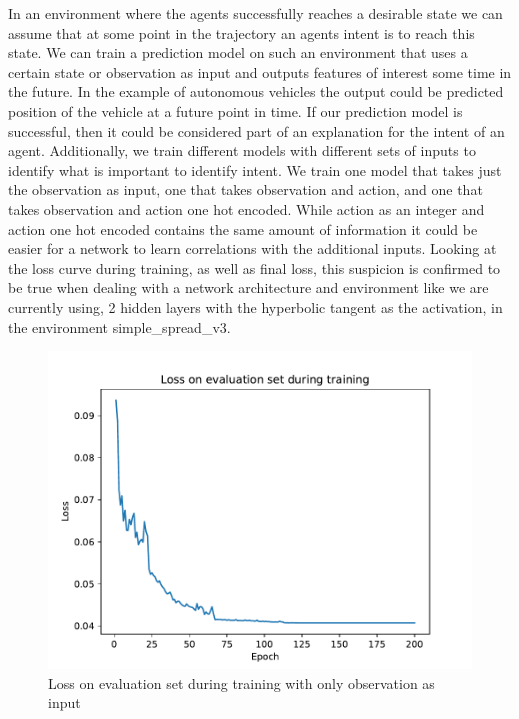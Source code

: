 \documentclass[UKenglish]{uiomasterthesis}
\begin{document}
In an environment where the agents successfully reaches a desirable state we can assume that at some point in the trajectory an agents intent is to reach this state. We can train a prediction model on such an environment that uses a certain state or observation as input and outputs features of interest some time in the future. In the example of autonomous vehicles the output could be predicted position of the vehicle at a future point in time. If our prediction model is successful, then it could be considered part of an explanation for the intent of an agent.
Additionally, we train different models with different sets of inputs to identify what is important to identify intent. We train one model that takes just the observation as input, one that takes observation and action, and one that takes observation and action one hot encoded. While action as an integer and action one hot encoded contains the same amount of information it could be easier for a network to learn correlations with the additional inputs. Looking at the loss curve during training, as well as final loss, this suspicion is confirmed to be true when dealing with a network architecture and environment like we are currently using, 2 hidden layers with the hyperbolic tangent as the activation, in the environment simple\_spread\_v3.


\begin{figure}[!ht]
	\includegraphics[width=\columnwidth]{images/pred_model_none.pdf}
	\caption{Loss on evaluation set during training with only observation as input}
	\label{fig:intgrad} 
\end{figure}
\end{document}
